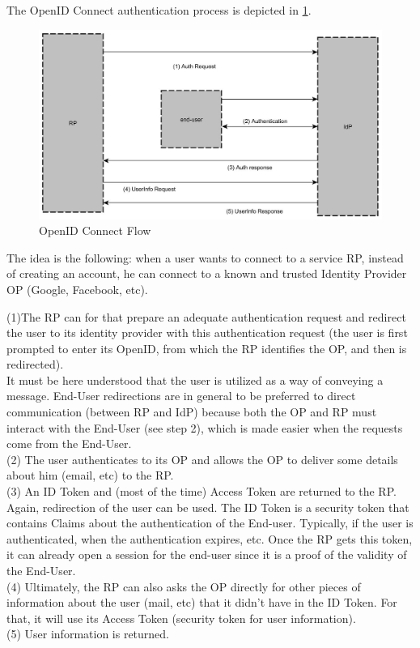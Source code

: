 The OpenID Connect authentication process is depicted in \ref{fig:OPIDCFlow}.

\begin{figure}[!ht]
	\centering
	\caption{OpenID Connect Flow}
	\label{fig:OPIDCFlow}
	\includegraphics[width=1\textwidth]{images/openID_connect.jpg}
\end{figure}

The idea is the following: when a user wants to connect to a service RP, instead of creating an account, he can connect to a known and trusted Identity Provider OP (Google, Facebook, etc). 

(1)The RP can for that prepare an adequate authentication request and redirect the user to its identity provider with this authentication request (the user is first prompted to enter its OpenID, from which the RP identifies the OP, and then is redirected). 
\\It must be here understood that the user is utilized as a way of conveying a message. End-User redirections are in general to be preferred to direct communication (between RP and IdP) because both the OP and RP must interact with the End-User (see step 2), which is made easier when the requests come from the End-User.
\\(2) The user authenticates to its OP and allows the OP to deliver some details about him (email, etc) to the RP.
\\(3) An ID Token and (most of the time) Access Token are returned to the RP. Again, redirection of the user can be used. The ID Token is a security token that contains Claims about the authentication of the End-user. Typically, if the user is authenticated, when the authentication expires, etc. Once the RP gets this token, it can already open a session for the end-user since it is a proof of the validity of the End-User.
\\(4) Ultimately, the RP can also asks the OP directly for other pieces of information about the user (mail, etc) that it didn't have in the ID Token. For that, it will use its Access Token (security token for user information).
\\(5) User information is returned.

